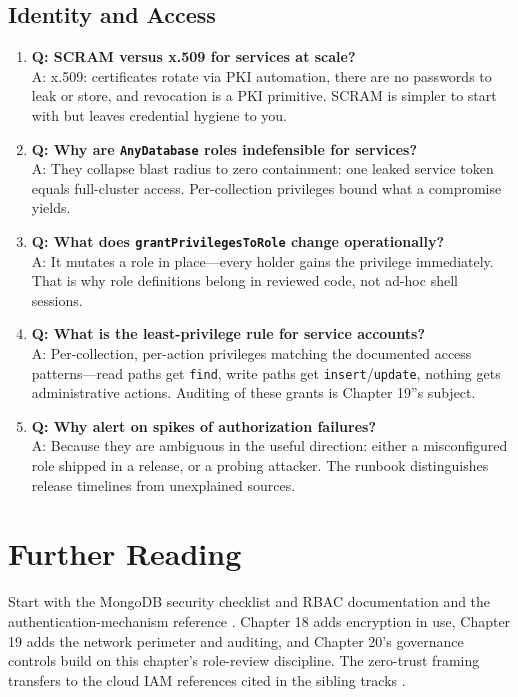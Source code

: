 \subsection{Identity and Access}
\begin{enumerate}
    \item \textbf{Q: SCRAM versus x.509 for services at scale?}\\
    A: x.509: certificates rotate via PKI automation, there are no passwords to leak or store, and revocation is a PKI primitive. SCRAM is simpler to start with but leaves credential hygiene to you.

    \item \textbf{Q: Why are \texttt{AnyDatabase} roles indefensible for services?}\\
    A: They collapse blast radius to zero containment: one leaked service token equals full-cluster access. Per-collection privileges bound what a compromise yields.

    \item \textbf{Q: What does \texttt{grantPrivilegesToRole} change operationally?}\\
    A: It mutates a role in place---every holder gains the privilege immediately. That is why role definitions belong in reviewed code, not ad-hoc shell sessions.

    \item \textbf{Q: What is the least-privilege rule for service accounts?}\\
    A: Per-collection, per-action privileges matching the documented access patterns---read paths get \texttt{find}, write paths get \texttt{insert}/\texttt{update}, nothing gets administrative actions. Auditing of these grants is Chapter 19''s subject.

    \item \textbf{Q: Why alert on spikes of authorization failures?}\\
    A: Because they are ambiguous in the useful direction: either a misconfigured role shipped in a release, or a probing attacker. The runbook distinguishes release timelines from unexplained sources.
\end{enumerate}

\section{Further Reading}
Start with the MongoDB security checklist and RBAC documentation \cite{mongodbSecurityChecklistDocs,mongodbRBACDocs} and the authentication-mechanism reference \cite{mongodbAuthDocs}. Chapter 18 adds encryption in use, Chapter 19 adds the network perimeter and auditing, and Chapter 20's governance controls build on this chapter's role-review discipline. The zero-trust framing transfers to the cloud IAM references cited in the sibling tracks \cite{cosmosPartitionDocs}.

